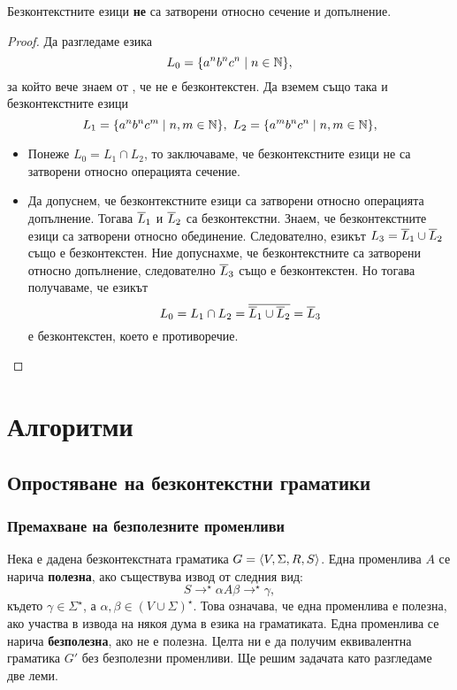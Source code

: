 \begin{thm}
  Безконтекстните езици {\bf не} са затворени относно сечение и допълнение.
\end{thm}
\begin{proof}
  Да разгледаме езика
  \[L_0 = \{a^nb^nc^n\mid n\in\mathbb{N}\},\] за който вече знаем от , че не е безконтекстен.
  Да вземем също така и безконтекстните езици 
  \[L_1 = \{a^nb^nc^m\mid n,m\in\mathbb{N}\},\ L_2 = \{a^mb^nc^n\mid n,m\in\mathbb{N}\},\]
  \begin{itemize}
  \item 
    Понеже $L_0 = L_1\cap L_2$, то заключаваме, че безконтекстните езици не са затворени 
    относно операцията сечение.
  \item
    Да допуснем, че безконтекстните езици са затворени относно операцията допълнение.
    Тогава  $\overline{L}_1$ и $\overline{L}_2$ са безконтекстни.
    Знаем, че безконтекстните езици са затворени относно обединение. 
    Следователно, езикът $L_3 = \overline{L}_1 \cup \overline{L}_2$ също е безконтекстен.
    Ние допуснахме, че безконтекстните са затворени относно допълнение, следователно $\overline{L}_3$
    също е безконтекстен.
    Но тогава получаваме, че езикът
    \[L_0 = L_1 \cap L_2 = \overline{\overline{L}_1 \cup \overline{L}_2} = \overline{L}_3\]
    е безконтекстен, което е противоречие.
  \end{itemize}
\end{proof}


\section{Алгоритми}

\subsection{Опростяване на безконтекстни граматики}

\subsubsection*{Премахване на безполезните променливи}

Нека е дадена безконтекстната граматика $G = \langle{V,\Sigma,R,S}\rangle$.
Една променлива $A$ се нарича {\bf полезна}, ако съществува извод от следния вид:
\[S \to^\star \alpha A \beta \to^\star \gamma,\]
където $\gamma \in \Sigma^\star$, а $\alpha,\beta \in (V \cup \Sigma)^\star$.
Това означава, че една променлива е полезна, ако участва в извода на някоя дума в езика на граматиката.
Една променлива се нарича {\bf безполезна}, ако не е полезна.
Целта ни е да получим еквивалентна граматика $G'$ без безполезни променливи.
Ще решим задачата като разгледаме две леми.

